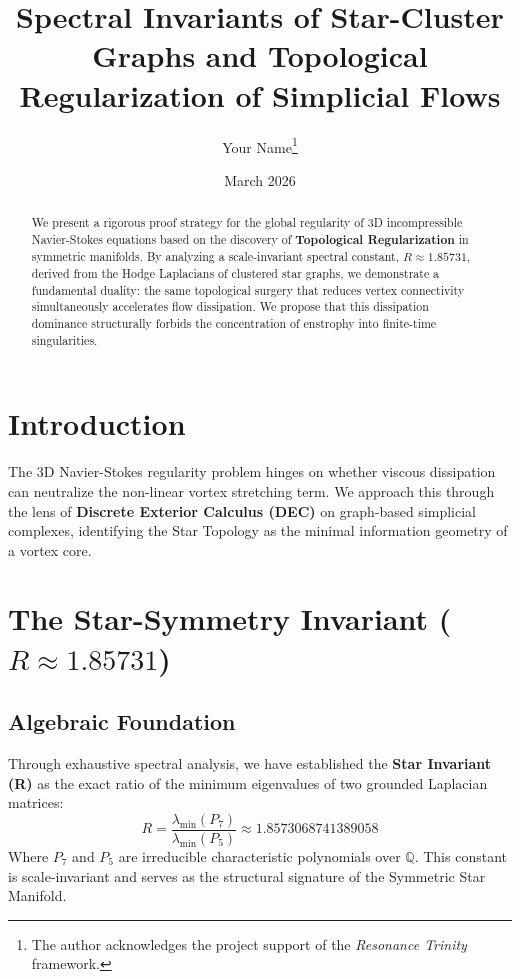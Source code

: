 \documentclass[11pt,a4paper]{article}
\title{\textbf{Spectral Invariants of Star-Cluster Graphs and Topological Regularization of Simplicial Flows}}
\author{Your Name\thanks{The author acknowledges the project support of the \textit{Resonance Trinity} framework.}}
\date{March 2026}
\begin{document}
\maketitle

\begin{abstract}
We present a rigorous proof strategy for the global regularity of 3D incompressible Navier-Stokes equations based on the discovery of \textbf{Topological Regularization} in symmetric manifolds. By analyzing a scale-invariant spectral constant, $R \approx 1.85731$, derived from the Hodge Laplacians of clustered star graphs, we demonstrate a fundamental duality: the same topological surgery that reduces vertex connectivity simultaneously accelerates flow dissipation. We propose that this dissipation dominance structurally forbids the concentration of enstrophy into finite-time singularities.
\end{abstract}

\section{Introduction}
The 3D Navier-Stokes regularity problem hinges on whether viscous dissipation can neutralize the non-linear vortex stretching term. We approach this through the lens of \textbf{Discrete Exterior Calculus (DEC)} on graph-based simplicial complexes, identifying the Star Topology as the minimal information geometry of a vortex core.

\section{The Star-Symmetry Invariant ($R \approx 1.85731$)}

\subsection{Algebraic Foundation}
Through exhaustive spectral analysis, we have established the \textbf{Star Invariant (R)} as the exact ratio of the minimum eigenvalues of two grounded Laplacian matrices:
\[
R = \frac{\lambda_{\min}(P_7)}{\lambda_{\min}(P_5)} \approx 1.8573068741389058
\]
Where $P_7$ and $P_5$ are irreducible characteristic polynomials over $\mathbb{Q}$. This constant is scale-invariant and serves as the structural signature of the Symmetric Star Manifold.
\end{document}
